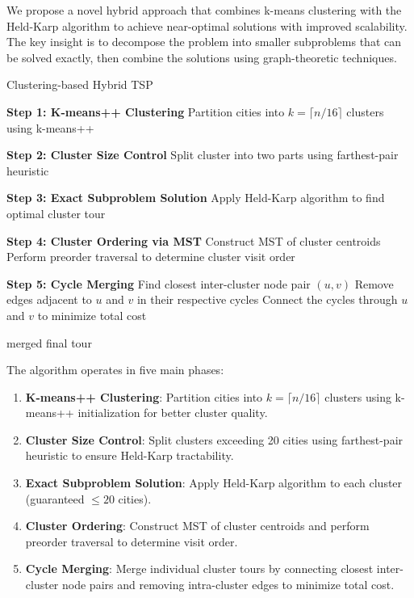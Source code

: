 \documentclass[sigconf]{acmart}
\begin{document}
We propose a novel hybrid approach that combines k-means clustering with the Held-Karp algorithm to achieve near-optimal solutions with improved scalability. The key insight is to decompose the problem into smaller subproblems that can be solved exactly, then combine the solutions using graph-theoretic techniques.

\begin{algorithm}
\caption{Clustering-based Hybrid TSP}
\begin{algorithmic}[1]
\State \textbf{Step 1: K-means++ Clustering}
\State Partition cities into $k = \lceil n/16 \rceil$ clusters using k-means++

\State \textbf{Step 2: Cluster Size Control}
    \State Split cluster into two parts using farthest-pair heuristic
\EndFor

\State \textbf{Step 3: Exact Subproblem Solution}
    \State Apply Held-Karp algorithm to find optimal cluster tour
\EndFor

\State \textbf{Step 4: Cluster Ordering via MST}
\State Construct MST of cluster centroids
\State Perform preorder traversal to determine cluster visit order

\State \textbf{Step 5: Cycle Merging}
    \State Find closest inter-cluster node pair $(u, v)$
    \State Remove edges adjacent to $u$ and $v$ in their respective cycles
    \State Connect the cycles through $u$ and $v$ to minimize total cost
\EndFor

\State \Return merged final tour
\end{algorithmic}
\end{algorithm}

The algorithm operates in five main phases:
\begin{enumerate}
\item \textbf{K-means++ Clustering}: Partition cities into $k = \lceil n/16 \rceil$ clusters using k-means++ initialization for better cluster quality.
\item \textbf{Cluster Size Control}: Split clusters exceeding 20 cities using farthest-pair heuristic to ensure Held-Karp tractability.
\item \textbf{Exact Subproblem Solution}: Apply Held-Karp algorithm to each cluster (guaranteed $\leq 20$ cities).
\item \textbf{Cluster Ordering}: Construct MST of cluster centroids and perform preorder traversal to determine visit order.
\item \textbf{Cycle Merging}: Merge individual cluster tours by connecting closest inter-cluster node pairs and removing intra-cluster edges to minimize total cost.
\end{enumerate}
\end{document}
